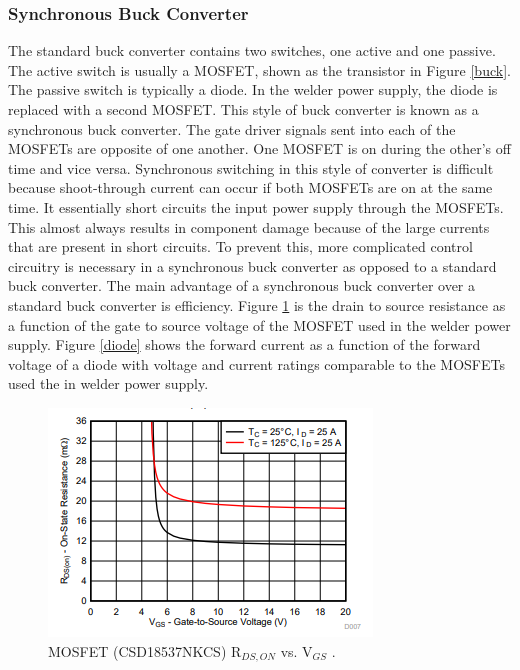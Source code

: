 \documentclass[11pt]{article}
\begin{document}
    \subsubsection{Synchronous Buck Converter}
    
    \noindent The standard buck converter contains two switches, one active and one passive. The active switch is usually a MOSFET, shown as the transistor in Figure \ref{buck}. The passive switch is typically a diode. In the welder power supply, the diode is replaced with a second MOSFET. This style of buck converter is known as a synchronous buck converter. The gate driver signals sent into each of the MOSFETs are opposite of one another. One MOSFET is on during the other's off time and vice versa. Synchronous switching in this style of converter is difficult because shoot-through current can occur if both MOSFETs are on at the same time. It essentially short circuits the input power supply through the MOSFETs. This almost always results in component damage because of the large currents that are present in short circuits. To prevent this, more complicated control circuitry is necessary in a synchronous buck converter as opposed to a standard buck converter. The main advantage of a synchronous buck converter over a standard buck converter is efficiency. Figure \ref{mosfet} is the drain to source resistance as a function of the gate to source voltage of the MOSFET used in the welder power supply. Figure \ref{diode} shows the forward current as a function of the forward voltage of a diode with voltage and current ratings comparable to the MOSFETs used the in welder power supply.
    
    \begin{figure}[H]
            \centering
            \includegraphics[width=0.5\linewidth]{mosfet.PNG}
            \caption{MOSFET (CSD18537NKCS) R$_{DS,ON}$ vs. V$_{GS}$ \cite{texas_instruments_csd18537nkcs_2013}.}
            \label{mosfet}
        \end{figure}
    
\end{document}
